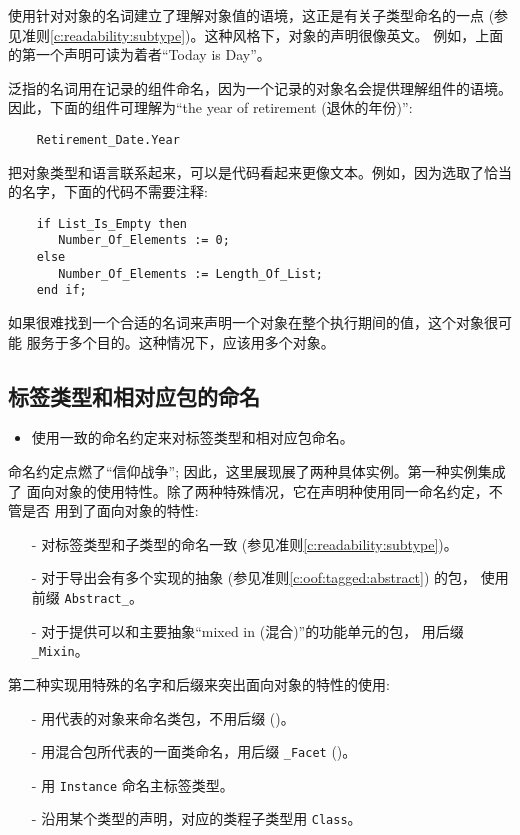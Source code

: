 \begin{blockindent}
使用针对对象的名词建立了理解对象值的语境，这正是有关子类型命名的一点
(参见准则\ref{c:readability:subtype})。这种风格下，对象的声明很像英文。
例如，上面的第一个声明可读为着者``Today is Day''。

泛指的名词用在记录的组件命名，因为一个记录的对象名会提供理解组件的语境。
因此，下面的组件可理解为``the year of retirement (退休的年份)'':
\begin{lstlisting}
    Retirement_Date.Year
\end{lstlisting}
把对象类型和语言联系起来，可以是代码看起来更像文本。例如，因为选取了恰当
的名字，下面的代码不需要注释:
\begin{lstlisting}
    if List_Is_Empty then
       Number_Of_Elements := 0;
    else
       Number_Of_Elements := Length_Of_List;
    end if;
\end{lstlisting}
\end{blockindent}

\begin{blockindent}
如果很难找到一个合适的名词来声明一个对象在整个执行期间的值，这个对象很可能
服务于多个目的。这种情况下，应该用多个对象。
\end{blockindent}

\subsection{标签类型和相对应包的命名}
\label{c:readability:tag}
\begin{itemize}
    \item 使用一致的命名约定来对标签类型和相对应包命名。
\end{itemize}

\begin{blockindent}
命名约定点燃了``信仰战争''; 因此，这里展现展了两种具体实例。第一种实例集成了
面向对象的使用特性。除了两种特殊情况，它在声明种使用同一命名约定，不管是否
用到了面向对象的特性:
\begin{itemize}
    \item[-] 对标签类型和子类型的命名一致
(参见准则\ref{c:readability:subtype})。
    \item[-] 对于导出会有多个实现的抽象 (参见准则\ref{c:oof:tagged:abstract}) 的包，
使用前缀 \texttt{Abstract\_}。
    \item[-] 对于提供可以和主要抽象``mixed in (混合)''的功能单元的包，
用后缀 \texttt{\_Mixin}。
\end{itemize}
第二种实现用特殊的名字和后缀来突出面向对象的特性的使用:
\begin{itemize}
    \item[-] 用代表的对象来命名类包，不用后缀 (\cite{rosen95})。
    \item[-] 用混合包所代表的一面类命名，用后缀 \texttt{\_Facet}
	     (\cite{rosen95})。
    \item[-] 用 \texttt{Instance} 命名主标签类型。
    \item[-] 沿用某个类型的声明，对应的类程子类型用 \texttt{Class}。
\end{itemize}
\end{blockindent}

